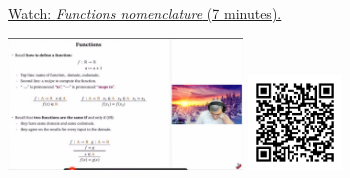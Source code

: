 
\begin{minipage}{10cm}
    \href{https://act4e-spring21.netlify.app/videos/spring2021-morphisms:functions-nomenclature.html}{Watch: \emph{Functions nomenclature} (7 minutes).}
        
    \href{https://act4e-spring21.netlify.app/videos/spring2021-morphisms:functions-nomenclature.html}{\includegraphics[height=3.5cm]{spring2021-morphisms:functions-nomenclature/thumbnails.jpg}}
    \href{https://act4e-spring21.netlify.app/videos/spring2021-morphisms:functions-nomenclature.html}{\includegraphics[height=2.5cm]{spring2021-morphisms:functions-nomenclature/qrcode.png}}
\end{minipage}
